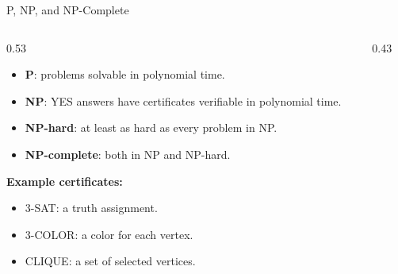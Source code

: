 \documentclass[aspectratio=43,8pt]{beamer}
\begin{document}
\begin{frame}{P, NP, and NP-Complete}
\begin{columns}[T]
\begin{column}{0.53\textwidth}
\begin{itemize}
    \item \textbf{P}: problems solvable in polynomial time.
    \item \textbf{NP}: YES answers have certificates verifiable in polynomial time.
    \item \textbf{NP-hard}: at least as hard as every problem in NP.
    \item \textbf{NP-complete}: both in NP and NP-hard.
\end{itemize}
\vspace{0.25cm}
\textbf{Example certificates:}
\begin{itemize}
    \item 3-SAT: a truth assignment.
    \item 3-COLOR: a color for each vertex.
    \item CLIQUE: a set of selected vertices.
\end{itemize}
\end{column}
\begin{column}{0.43\textwidth}
\centering
{}
\vspace{0.25cm}
\end{column}
\end{columns}
\end{frame}
\end{document}
